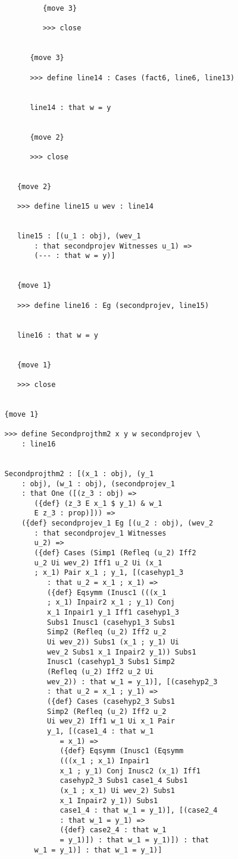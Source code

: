 \documentclass[12pt]{article}
\begin{document}
\begin{verbatim}
            {move 3}

            >>> close


         {move 3}

         >>> define line14 : Cases (fact6, line6, line13)


         line14 : that w = y


         {move 2}

         >>> close


      {move 2}

      >>> define line15 u wev : line14


      line15 : [(u_1 : obj), (wev_1 
          : that secondprojev Witnesses u_1) => 
          (--- : that w = y)]


      {move 1}

      >>> define line16 : Eg (secondprojev, line15)


      line16 : that w = y


      {move 1}

      >>> close


   {move 1}

   >>> define Secondprojthm2 x y w secondprojev \
       : line16


   Secondprojthm2 : [(x_1 : obj), (y_1 
       : obj), (w_1 : obj), (secondprojev_1 
       : that One ([(z_3 : obj) => 
          ({def} (z_3 E x_1 $ y_1) & w_1 
          E z_3 : prop)])) => 
       ({def} secondprojev_1 Eg [(u_2 : obj), (wev_2 
          : that secondprojev_1 Witnesses 
          u_2) => 
          ({def} Cases (Simp1 (Refleq (u_2) Iff2 
          u_2 Ui wev_2) Iff1 u_2 Ui (x_1 
          ; x_1) Pair x_1 ; y_1, [(casehyp1_3 
             : that u_2 = x_1 ; x_1) => 
             ({def} Eqsymm (Inusc1 (((x_1 
             ; x_1) Inpair2 x_1 ; y_1) Conj 
             x_1 Inpair1 y_1 Iff1 casehyp1_3 
             Subs1 Inusc1 (casehyp1_3 Subs1 
             Simp2 (Refleq (u_2) Iff2 u_2 
             Ui wev_2)) Subs1 (x_1 ; y_1) Ui 
             wev_2 Subs1 x_1 Inpair2 y_1)) Subs1 
             Inusc1 (casehyp1_3 Subs1 Simp2 
             (Refleq (u_2) Iff2 u_2 Ui 
             wev_2)) : that w_1 = y_1)], [(casehyp2_3 
             : that u_2 = x_1 ; y_1) => 
             ({def} Cases (casehyp2_3 Subs1 
             Simp2 (Refleq (u_2) Iff2 u_2 
             Ui wev_2) Iff1 w_1 Ui x_1 Pair 
             y_1, [(case1_4 : that w_1 
                = x_1) => 
                ({def} Eqsymm (Inusc1 (Eqsymm 
                (((x_1 ; x_1) Inpair1 
                x_1 ; y_1) Conj Inusc2 (x_1) Iff1 
                casehyp2_3 Subs1 case1_4 Subs1 
                (x_1 ; x_1) Ui wev_2) Subs1 
                x_1 Inpair2 y_1)) Subs1 
                case1_4 : that w_1 = y_1)], [(case2_4 
                : that w_1 = y_1) => 
                ({def} case2_4 : that w_1 
                = y_1)]) : that w_1 = y_1)]) : that 
          w_1 = y_1)] : that w_1 = y_1)]



\end{verbatim}
\end{document}
